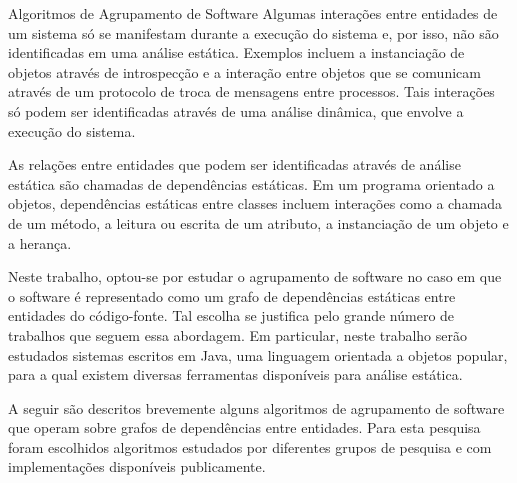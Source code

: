 \begin{section}{Algoritmos de Agrupamento de Software}
Algumas interações entre entidades de um sistema só se manifestam durante a execução do sistema e, por isso, não são identificadas em uma análise estática. Exemplos incluem a instanciação de objetos através de introspecção e a interação entre objetos que se comunicam através de um protocolo de troca de mensagens entre processos. Tais interações só podem ser identificadas através de uma análise dinâmica, que envolve a execução do sistema.

As relações entre entidades que podem ser identificadas através de análise estática são chamadas de dependências estáticas. Em um programa orientado a objetos, dependências estáticas entre classes incluem interações como a chamada de um método, a leitura ou escrita de um atributo, a instanciação de um objeto e a herança.

Neste trabalho, optou-se por estudar o agrupamento de software no caso em que o software é representado como um grafo de dependências estáticas entre entidades do código-fonte. Tal escolha se justifica pelo grande número de trabalhos que seguem essa abordagem. Em particular, neste trabalho serão estudados sistemas escritos em Java, uma linguagem orientada a objetos popular, para a qual existem diversas ferramentas disponíveis para análise estática.

% 


% 

A seguir são descritos brevemente alguns algoritmos de agrupamento de software que operam sobre grafos de dependências entre entidades. Para esta pesquisa foram escolhidos algoritmos estudados por diferentes grupos de pesquisa e com implementações disponíveis publicamente.


\end{section}
